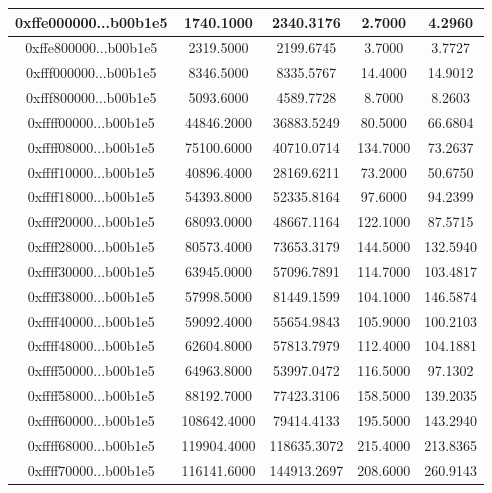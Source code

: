 \documentclass[12pt, a4paper]{article}
\begin{document}
\begin{table}[H]
\begin{tabular}{|c|c|c|c|c|}
0xffe000000...b00b1e5 &      1740.1000 &      2340.3176 &         2.7000 &        4.2960 \\ \hline
0xffe800000...b00b1e5 &      2319.5000 &      2199.6745 &         3.7000 &        3.7727 \\ \hline
0xfff000000...b00b1e5 &      8346.5000 &      8335.5767 &        14.4000 &       14.9012 \\ \hline
0xfff800000...b00b1e5 &      5093.6000 &      4589.7728 &         8.7000 &        8.2603 \\ \hline
0xffff00000...b00b1e5 &     44846.2000 &     36883.5249 &        80.5000 &       66.6804 \\ \hline
0xffff08000...b00b1e5 &     75100.6000 &     40710.0714 &       134.7000 &       73.2637 \\ \hline
0xffff10000...b00b1e5 &     40896.4000 &     28169.6211 &        73.2000 &       50.6750 \\ \hline
0xffff18000...b00b1e5 &     54393.8000 &     52335.8164 &        97.6000 &       94.2399 \\ \hline
0xffff20000...b00b1e5 &     68093.0000 &     48667.1164 &       122.1000 &       87.5715 \\ \hline
0xffff28000...b00b1e5 &     80573.4000 &     73653.3179 &       144.5000 &      132.5940 \\ \hline
0xffff30000...b00b1e5 &     63945.0000 &     57096.7891 &       114.7000 &      103.4817 \\ \hline
0xffff38000...b00b1e5 &     57998.5000 &     81449.1599 &       104.1000 &      146.5874 \\ \hline
0xffff40000...b00b1e5 &     59092.4000 &     55654.9843 &       105.9000 &      100.2103 \\ \hline
0xffff48000...b00b1e5 &     62604.8000 &     57813.7979 &       112.4000 &      104.1881 \\ \hline
0xffff50000...b00b1e5 &     64963.8000 &     53997.0472 &       116.5000 &       97.1302 \\ \hline
0xffff58000...b00b1e5 &     88192.7000 &     77423.3106 &       158.5000 &      139.2035 \\ \hline
0xffff60000...b00b1e5 &    108642.4000 &     79414.4133 &       195.5000 &      143.2940 \\ \hline
0xffff68000...b00b1e5 &    119904.4000 &    118635.3072 &       215.4000 &      213.8365 \\ \hline
0xffff70000...b00b1e5 &    116141.6000 &    144913.2697 &       208.6000 &      260.9143 \\ \hline

\end{tabular}
\end{table}
\end{document}
